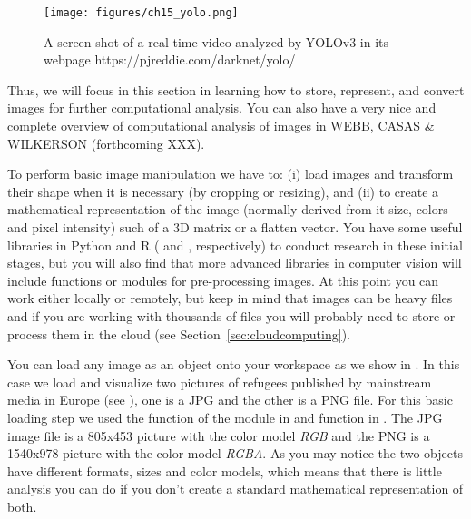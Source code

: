 \begin{figure}
\centering
\texttt{[image: figures/ch15\_yolo.png]}
\caption{A screen shot of a real-time video analyzed by YOLOv3 in its webpage https://pjreddie.com/darknet/yolo/}
\label{fig:yolo}
\end{figure}

Thus, we will focus in this section in learning how to store, represent, and convert images for further computational analysis. You can also have a very nice and complete overview of computational analysis of images in WEBB, CASAS & WILKERSON (forthcoming XXX).

To perform basic image manipulation we have to: (i) load images and transform their shape when it is necessary (by cropping or resizing), and (ii) to create a mathematical representation of the image (normally derived from it size, colors and pixel intensity) such of a 3D matrix or a flatten vector. You have some useful libraries in Python and R ( and , respectively) to conduct research in these initial stages, but you will also find that more advanced libraries in computer vision will include functions or modules for pre-processing images. At this point you can work either locally or remotely, but keep in mind that images can be heavy files and if you are working with thousands of files you will probably need to store or process them in the cloud (see Section~\ref{sec:cloudcomputing}).

You can load any image as an object onto your workspace as we show in . In this case we load and visualize two pictures of refugees published by mainstream media in Europe (see \citet{amores2019visual}), one is a JPG and the other is a PNG file. For this basic loading step we used the  function of the  module in  and  function in . The JPG image file is a 805x453 picture with the color model \textit{RGB} and the PNG is a 1540x978 picture with the color model \textit{RGBA}. As you may notice the two objects have different formats, sizes and color models, which means that there is little analysis you can do if you don't create a standard mathematical representation of both. 


